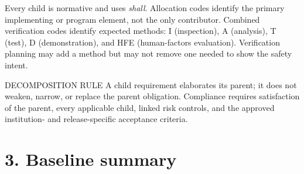 \documentclass[11pt,letterpaper]{article}
\begin{document}
Every child is normative and uses \textit{shall}. Allocation codes identify the primary implementing or program element, not the only contributor. Combined verification codes identify expected methods: I (inspection), A (analysis), T (test), D (demonstration), and HFE (human-factors evaluation). Verification planning may add a method but may not remove one needed to show the safety intent.

\begin{nlnotice}{DECOMPOSITION RULE}
A child requirement elaborates its parent; it does not weaken, narrow, or replace the parent obligation. Compliance requires satisfaction of the parent, every applicable child, linked risk controls, and the approved institution- and release-specific acceptance criteria.
\end{nlnotice}

\section{3. Baseline summary}
\end{document}
